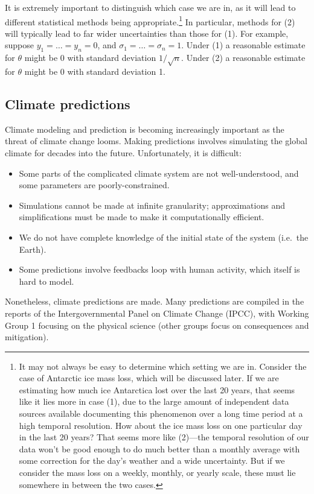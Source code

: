 \documentclass[letterpaper,12pt]{article}
\begin{document}
It is extremely important to distinguish which case we are in, as it will lead to different statistical methods being appropriate.\footnote{It may not always be easy to determine which setting we are in. Consider the case of Antarctic ice mass loss, which will be discussed later. If we are estimating how much ice Antarctica lost over the last 20 years, that seems like it lies more in case (1), due to the large amount of independent data sources available documenting this phenomenon over a long time period at a high temporal resolution. How about the ice mass loss on one particular day in the last 20 years? That seems more like (2)---the temporal resolution of our data won't be good enough to do much better than a monthly average with some correction for the day's weather and a wide uncertainty. But if we consider the mass loss on a weekly, monthly, or yearly scale, these must lie somewhere in between the two cases.} In particular, methods for (2) will typically lead to far wider uncertainties than those for (1). For example, suppose $y_1=\ldots=y_n=0$, and $\sigma_1=\ldots=\sigma_n=1$. Under (1) a reasonable estimate for $\theta$ might be $0$ with standard deviation $1/\sqrt{n}$. Under (2) a reasonable estimate for $\theta$ might be $0$ with standard deviation 1.

\subsection{Climate predictions}

Climate modeling and prediction is becoming increasingly important as the threat of climate change looms. Making predictions involves simulating the global climate for decades into the future. Unfortunately, it is difficult:
\begin{itemize}
  \item Some parts of the complicated climate system are not well-understood, and some parameters are poorly-constrained.
  \item Simulations cannot be made at infinite granularity; approximations and simplifications must be made to make it computationally efficient.
  \item We do not have complete knowledge of the initial state of the system (i.e.~the Earth).
  \item Some predictions involve feedbacks loop with human activity, which itself is hard to model.
\end{itemize}
Nonetheless, climate predictions are made. Many predictions are compiled in the reports of the Intergovernmental Panel on Climate Change (IPCC), with Working Group 1 \citeyearpar{ipcc2021physical}focusing on the physical science (other groups focus on consequences and mitigation).
\end{document}
